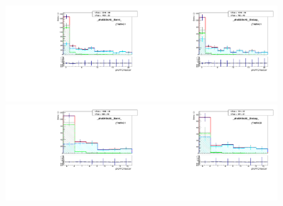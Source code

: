 \begin{figure}[htb]
  \begin{center}
   \includegraphics[width=0.45\textwidth]{../figs/figs_v11/ELECTRON_WGamma/MCclosureWjetsPlusWg/c_TEMPL_CHISO_UNblind__phoEt35to45__Barrel__RooFit_MCclosure.pdf}\includegraphics[width=0.45\textwidth]{../figs/figs_v11/ELECTRON_WGamma/MCclosureWjetsPlusWg/c_TEMPL_CHISO_UNblind__phoEt35to45__Endcap__RooFit_MCclosure.pdf}\\
   \includegraphics[width=0.45\textwidth]{../figs/figs_v11/ELECTRON_WGamma/MCclosureWjetsPlusWg/c_TEMPL_CHISO_UNblind__phoEt45to55__Barrel__RooFit_MCclosure.pdf}\includegraphics[width=0.45\textwidth]{../figs/figs_v11/ELECTRON_WGamma/MCclosureWjetsPlusWg/c_TEMPL_CHISO_UNblind__phoEt45to55__Endcap__RooFit_MCclosure.pdf}\\

\end{center}
\end{figure}
